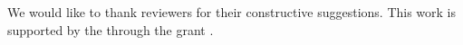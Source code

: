\documentclass[sigplan,screen]{acmart}
\newcommand{\AK}[1]{\AgdaKeyword{#1}}
\begin{document}
%

\begin{acks}
We would like to thank reviewers for their constructive suggestions.
This work is supported by the  through the grant
.
\end{acks}


\end{document}
